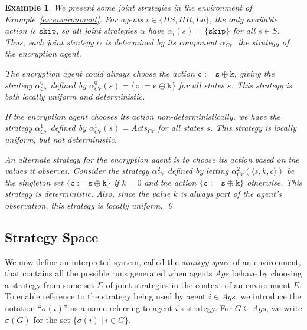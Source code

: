 \documentclass[a4wide]{article}
\theoremstyle{examplesty}
\newtheorem{example}{Example}
\newcommand{\strat}{\sigma}
\newcommand{\Ags}{\mathit{Ags}}
\newcommand{\Env}{E}
\newcommand{\Acts}{\mathit{Acts}}
\newcommand{\Crypt}{Cr}
\newcommand{\Low}{Lo}
\begin{document}
\begin{example} \label{ex:strategy} 
We present some joint strategies in the environment of Example~\ref{ex:environment}. 
For agents $i \in \{HS,HR, \Low\}$, the only available action is $\mathtt{skip}$, so
all joint strategies $\alpha$ have $\alpha_i(s) = \{\mathtt{skip}\}$ for all $s\in S$. 
Thus, each joint strategy $\alpha$ is determined by its component $\alpha_{\Crypt}$, the strategy of the 
encryption agent. 

The encryption agent  could always choose the action $\mathtt{c} := \mathtt{s}\oplus \mathtt{k}$, giving 
the strategy $\alpha_{\Crypt}^0$ defined by $\alpha_{\Crypt}^0(s) = \{\mathtt{c} := \mathtt{s}\oplus \mathtt{k}\}$ for all states $s$. 
This strategy is both locally uniform and deterministic. 

If the encryption agent chooses its action non-deterministically, 
we have the strategy $\alpha_{\Crypt}^1$ defined by $\alpha_{\Crypt}^1(s) = \Acts_{\Crypt}$ for all states $s$. 
This strategy is locally uniform, but not deterministic. 

An alternate strategy for the encryption agent is to choose its action based on the 
values it observes. Consider the strategy $\alpha_{\Crypt}^2$ defined by letting $\alpha_{\Crypt}^2(\langle s,k,c\rangle)$ be the singleton set 
$\{\mathtt{c} := \mathtt{s}\oplus \mathtt{k}\}$ if $k=0$ and 
the action $\{\mathtt{c} := \mathtt{s}\oplus \overline{\mathtt{k}}\}$ 
otherwise. This strategy is deterministic. Also, since the value $k$ is always part of
the agent's observation, this strategy is locally uniform. \qed 
\end{example} 




 
\subsection{Strategy Space}
 \label{sec:generatedIS}
 
 We now define an interpreted system, 
called  the \emph{strategy space}  of an environment, 
 that contains all the possible runs generated 
when agents $\Ags$ behave by choosing a strategy 
 from some set $\Sigma$ of joint strategies in the context of an environment $\Env$. 
 To enable reference to the strategy being used by agent $i\in \Ags$, we 
introduce  the notation 
 ``$\strat(i)$'' as a name referring to agent $i$'s strategy. 
 For $G\subseteq \Ags$, we write $\strat(G)$ for the set  $\{\strat(i)~|~ i\in  G\}$. 
\end{document}
